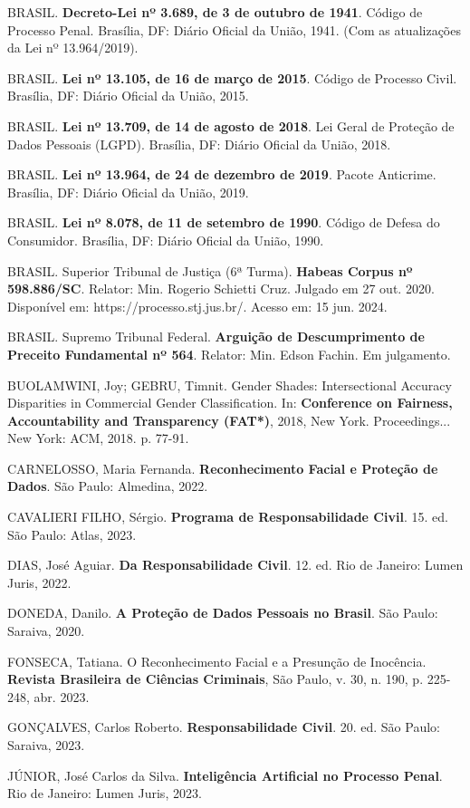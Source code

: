 \documentclass[12pt,a4paper]{article}
\begin{document}
BRASIL. \textbf{Decreto-Lei nº 3.689, de 3 de outubro de 1941}. Código de Processo Penal. Brasília, DF: Diário Oficial da União, 1941. (Com as atualizações da Lei nº 13.964/2019).

BRASIL. \textbf{Lei nº 13.105, de 16 de março de 2015}. Código de Processo Civil. Brasília, DF: Diário Oficial da União, 2015.

BRASIL. \textbf{Lei nº 13.709, de 14 de agosto de 2018}. Lei Geral de Proteção de Dados Pessoais (LGPD). Brasília, DF: Diário Oficial da União, 2018.

BRASIL. \textbf{Lei nº 13.964, de 24 de dezembro de 2019}. Pacote Anticrime. Brasília, DF: Diário Oficial da União, 2019.

BRASIL. \textbf{Lei nº 8.078, de 11 de setembro de 1990}. Código de Defesa do Consumidor. Brasília, DF: Diário Oficial da União, 1990.

BRASIL. Superior Tribunal de Justiça (6ª Turma). \textbf{Habeas Corpus nº 598.886/SC}. Relator: Min. Rogerio Schietti Cruz. Julgado em 27 out. 2020. Disponível em: https://processo.stj.jus.br/. Acesso em: 15 jun. 2024.

BRASIL. Supremo Tribunal Federal. \textbf{Arguição de Descumprimento de Preceito Fundamental nº 564}. Relator: Min. Edson Fachin. Em julgamento.

BUOLAMWINI, Joy; GEBRU, Timnit. Gender Shades: Intersectional Accuracy Disparities in Commercial Gender Classification. In: \textbf{Conference on Fairness, Accountability and Transparency (FAT*)}, 2018, New York. Proceedings... New York: ACM, 2018. p. 77-91.

CARNELOSSO, Maria Fernanda. \textbf{Reconhecimento Facial e Proteção de Dados}. São Paulo: Almedina, 2022.

CAVALIERI FILHO, Sérgio. \textbf{Programa de Responsabilidade Civil}. 15. ed. São Paulo: Atlas, 2023.

DIAS, José Aguiar. \textbf{Da Responsabilidade Civil}. 12. ed. Rio de Janeiro: Lumen Juris, 2022.

DONEDA, Danilo. \textbf{A Proteção de Dados Pessoais no Brasil}. São Paulo: Saraiva, 2020.

FONSECA, Tatiana. O Reconhecimento Facial e a Presunção de Inocência. \textbf{Revista Brasileira de Ciências Criminais}, São Paulo, v. 30, n. 190, p. 225-248, abr. 2023.

GONÇALVES, Carlos Roberto. \textbf{Responsabilidade Civil}. 20. ed. São Paulo: Saraiva, 2023.

JÚNIOR, José Carlos da Silva. \textbf{Inteligência Artificial no Processo Penal}. Rio de Janeiro: Lumen Juris, 2023.
\end{document}
